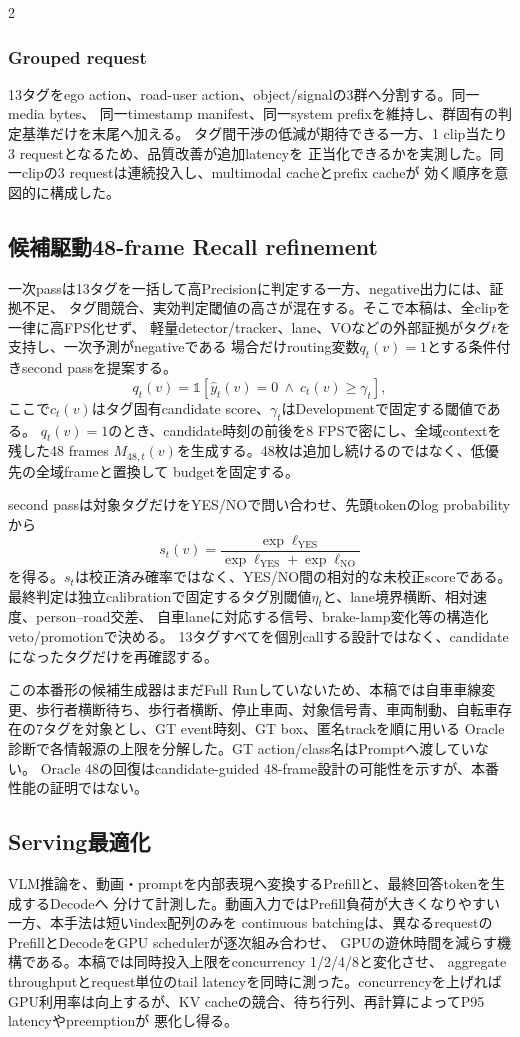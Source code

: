 \documentclass[9pt,a4paper]{extarticle}
\begin{document}
\begin{multicols}{2}
\subsubsection*{Grouped request}
13タグをego action、road-user action、object/signalの3群へ分割する。同一media bytes、
同一timestamp manifest、同一system prefixを維持し、群固有の判定基準だけを末尾へ加える。
タグ間干渉の低減が期待できる一方、1 clip当たり3 requestとなるため、品質改善が追加latencyを
正当化できるかを実測した。同一clipの3 requestは連続投入し、multimodal cacheとprefix cacheが
効く順序を意図的に構成した。

\subsection{候補駆動48-frame Recall refinement}
一次passは13タグを一括して高Precisionに判定する一方、negative出力には、証拠不足、
タグ間競合、実効判定閾値の高さが混在する。そこで本稿は、全clipを一律に高FPS化せず、
軽量detector/tracker、lane、VOなどの外部証拠がタグ$t$を支持し、一次予測がnegativeである
場合だけrouting変数$q_t(v)=1$とする条件付きsecond passを提案する。
\[
 q_t(v)=\mathbb{1}\!\left[\hat y_t(v)=0\ \land\
 c_t(v)\ge\gamma_t\right],
\]
ここで$c_t(v)$はタグ固有candidate score、$\gamma_t$はDevelopmentで固定する閾値である。
$q_t(v)=1$のとき、candidate時刻の前後を8 FPSで密にし、全域contextを残した48 frames
$M_{48,t}(v)$を生成する。48枚は追加し続けるのではなく、低優先の全域frameと置換して
budgetを固定する。

second passは対象タグだけをYES/NOで問い合わせ、先頭tokenのlog probabilityから
\[
 s_t(v)=\frac{\exp \ell_{\mathrm{YES}}}
 {\exp \ell_{\mathrm{YES}}+\exp \ell_{\mathrm{NO}}}
\]
を得る。$s_t$は校正済み確率ではなく、YES/NO間の相対的な未校正scoreである。
最終判定は独立calibrationで固定するタグ別閾値$\eta_t$と、lane境界横断、相対速度、person--road交差、
自車laneに対応する信号、brake-lamp変化等の構造化veto/promotionで決める。
13タグすべてを個別callする設計ではなく、candidateになったタグだけを再確認する。

この本番形の候補生成器はまだFull Runしていないため、本稿では自車車線変更、歩行者横断待ち、歩行者横断、停止車両、対象信号青、車両制動、自転車存在の7タグを対象とし、GT event時刻、GT box、匿名trackを順に用いる
Oracle診断で各情報源の上限を分解した。GT action/class名はPromptへ渡していない。
Oracle 48の回復はcandidate-guided 48-frame設計の可能性を示すが、本番性能の証明ではない。

\subsection{Serving最適化}
VLM推論を、動画・promptを内部表現へ変換するPrefillと、最終回答tokenを生成するDecodeへ
分けて計測した。動画入力ではPrefill負荷が大きくなりやすい一方、本手法は短いindex配列のみを
continuous batchingは、異なるrequestのPrefillとDecodeをGPU schedulerが逐次組み合わせ、
GPUの遊休時間を減らす機構である。本稿では同時投入上限をconcurrency 1/2/4/8と変化させ、
aggregate throughputとrequest単位のtail latencyを同時に測った。concurrencyを上げれば
GPU利用率は向上するが、KV cacheの競合、待ち行列、再計算によってP95 latencyやpreemptionが
悪化し得る。


\end{multicols}
\end{document}
